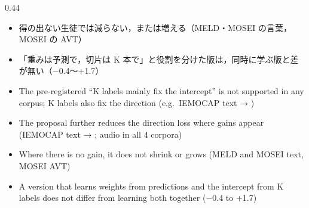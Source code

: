 \begin{frame}{}
\begin{columns}[T]
\begin{column}{0.44\textwidth}
{\begin{itemize}
\item 得の出ない生徒では減らない，または増える（MELD・MOSEI の言葉，MOSEI の AVT）
\item 「重みは予測で，切片は K 本で」と役割を分けた版は，同時に学ぶ版と差が無い（−0.4〜+1.7）
\end{itemize}
}{%
\begin{itemize}
\item The pre-registered ``K labels mainly fix the intercept'' is not supported in any corpus; K labels also fix the direction (e.g.\ IEMOCAP text  → )
\item The proposal further reduces the direction loss where gains appear (IEMOCAP text  → ; audio in all 4 corpora)
\item Where there is no gain, it does not shrink or grows (MELD and MOSEI text, MOSEI AVT)
\item A version that learns weights from predictions and the intercept from K labels does not differ from learning both together (−0.4 to +1.7)
\end{itemize}
}
\end{column}
\end{columns}
{\tiny\color{mMuted}}
\end{frame}

